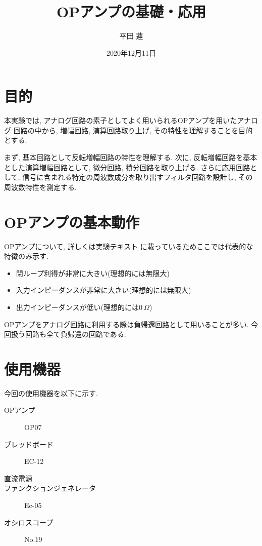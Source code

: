 \documentclass[titlepage]{jsarticle}
\title{OPアンプの基礎・応用}
\author{平田 蓮}
\date{2020年12月11日}
\begin{document}
\maketitle
\section{目的}
    本実験では, アナログ回路の素子としてよく用いられるOPアンプを用いたアナログ
    回路の中から, 増幅回路, 演算回路取り上げ, その特性を理解することを目的とする.

    まず, 基本回路として反転増幅回路の特性を理解する.
    次に, 反転増幅回路を基本とした演算増幅回路として,
    微分回路, 積分回路を取り上げる. さらに応用回路として,
    信号に含まれる特定の周波数成分を取り出すフィルタ回路を設計し,
    その周波数特性を測定する.

\section{OPアンプの基本動作}
    OPアンプについて, 詳しくは実験テキスト\cite{text}
    に載っているためここでは代表的な特徴のみ示す.

    \begin{itemize}
        \item 閉ループ利得が非常に大きい(理想的には無限大)
        \item 入力インピーダンスが非常に大きい(理想的には無限大)
        \item 出力インピーダンスが低い(理想的には$0 \ \Omega$)
    \end{itemize}

    OPアンプをアナログ回路に利用する際は負帰還回路として用いることが多い.
    今回扱う回路も全て負帰還の回路である.

\section{使用機器}
    今回の使用機器を以下に示す.

    \begin{description}
        \item[OPアンプ] OP07
        \item[ブレッドボード] EC-12
        \item[直流電源] 
        \item[ファンクションジェネレータ] Ec-05
        \item[オシロスコープ] No.19
    \end{description}
\end{document}
